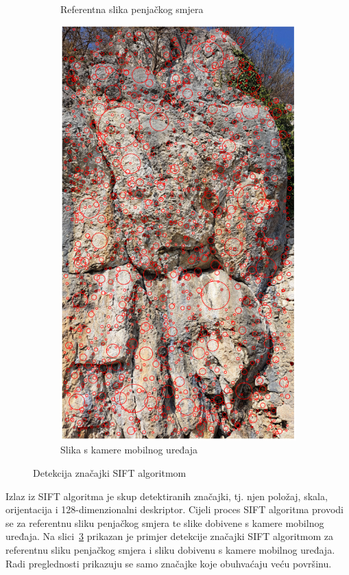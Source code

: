 \begin{figure}[H]
\begin{subfigure}[b]{0.48\textwidth}
        \caption{Referentna slika penjačkog smjera}
        \label{fig:feature_detection_train}
    \end{subfigure}
    \hfill
    \begin{subfigure}[b]{0.48\textwidth}
        \centering
        \includegraphics[width=\textwidth]{images/racunalniVid/feature_detection_frame.png}
        \caption{Slika s kamere mobilnog uređaja}
        \label{fig:feature_detection_frame}
    \end{subfigure}
    \caption{Detekcija značajki SIFT algoritmom}
    \label{fig:detekcija_znacajki}
\end{figure}

Izlaz iz SIFT algoritma je skup detektiranih značajki, tj. njen položaj, skala, orijentacija i 128-dimenzionalni deskriptor. Cijeli proces SIFT algoritma provodi se za referentnu sliku penjačkog smjera te slike dobivene s kamere mobilnog uređaja. Na slici~\ref{fig:detekcija_znacajki} prikazan je primjer detekcije značajki SIFT algoritmom za referentnu sliku penjačkog smjera i sliku dobivenu s kamere mobilnog uređaja. Radi preglednosti prikazuju se samo značajke koje obuhvaćaju veću površinu.

